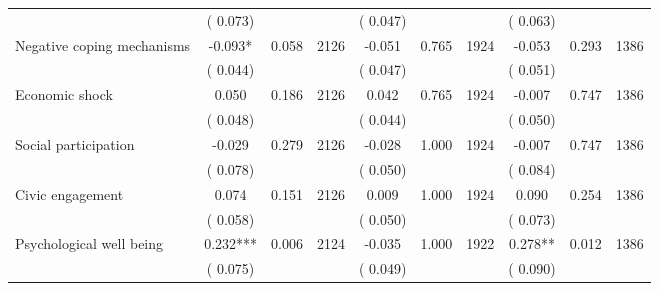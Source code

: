 \begin{tabular}{l*{9}{c}}
                               &        (       0.073) & &                                                                &       (       0.047) & &                                                         &       (       0.063) & & \\ 
 Negative coping mechanisms                &             -0.093*        &        0.058 & 2126        &             -0.051 &        0.765 & 1924               &       -0.053 &        0.293 & 1386       \\ 
                               &        (       0.044) & &                                                                &       (       0.047) & &                                                         &       (       0.051) & & \\ 
 Economic shock                &              0.050        &        0.186 & 2126        &              0.042 &        0.765 & 1924               &       -0.007 &        0.747 & 1386       \\ 
                               &        (       0.048) & &                                                                &       (       0.044) & &                                                         &       (       0.050) & & \\ 
 Social participation                &             -0.029        &        0.279 & 2126        &             -0.028 &        1.000 & 1924               &       -0.007 &        0.747 & 1386      \\ 
                               &        (       0.078) & &                                                                &       (       0.050) & &                                                         &       (       0.084) & & \\ 
 Civic engagement                &              0.074        &        0.151 & 2126        &              0.009 &        1.000 & 1924               &        0.090 &        0.254 & 1386       \\ 
                               &        (       0.058) & &                                                                &       (       0.050) & &                                                         &       (       0.073) & & \\ 
 Psychological well being                &              0.232***        &        0.006 & 2124        &             -0.035 &        1.000 & 1922               &        0.278** &        0.012 & 1386       \\ 
                               &        (       0.075) & &                                                                &       (       0.049) & &                                                         &       (       0.090) & & \\ 

\end{tabular}
